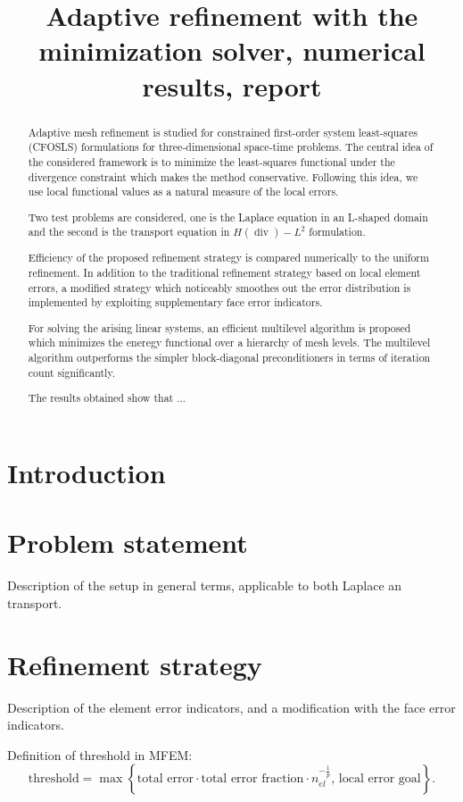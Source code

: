 \documentclass[a4paper,12pt]{amsart}
\title[AMR with the minimization solver, report] 
{Adaptive refinement with the minimization solver, numerical results, report}
\numberwithin{equation}{section}
\renewcommand{\div}{\operatorname{div}}
\begin{document}
 
\begin{abstract}
Adaptive mesh refinement is studied for constrained first-order system least-squares (CFOSLS) formulations for three-dimensional space-time problems. The central idea of the considered framework is to minimize the least-squares functional under the divergence constraint which makes the method conservative. Following this idea, we use local functional values as a natural measure of the local errors.

Two test problems are considered, one is the Laplace equation in an L-shaped domain and the second is the transport equation in $H(\div)-L^2$ formulation.

Efficiency of the proposed refinement strategy is compared numerically to the uniform refinement. In addition to the traditional refinement strategy based on local element errors, a modified strategy which noticeably smoothes out the error distribution is implemented by exploiting supplementary face error indicators.

For solving the arising linear systems, an efficient multilevel algorithm is proposed which minimizes the eneregy functional over a hierarchy of mesh levels. The multilevel algorithm outperforms the simpler block-diagonal preconditioners in terms of iteration count significantly.

The results obtained show that ...
\end{abstract}
\maketitle

\section{Introduction}

\section{Problem statement}
Description of the setup in general terms, applicable to both Laplace an transport.

\section{Refinement strategy}
Description of the element error indicators, and a modification with the face error indicators.

Definition of threshold in MFEM:
$$
\mbox{threshold} = \max \left\lbrace \mbox{total error} \cdot \mbox{total error fraction} \cdot n_{el}^{-\frac{1}{p}}, \, \mbox{local error goal} \right\rbrace.
$$
\end{document}
